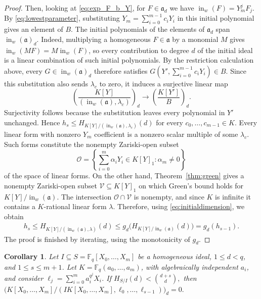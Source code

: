 \documentclass[11pt]{amsart}
\newtheorem{corollary}[theorem]{Corollary}
\theoremstyle{definition}
\newcommand{\F}{\mathbb F}
\newcommand{\ini}{\operatorname{in}}
\numberwithin{equation}{section}
\begin{document}
\begin{proof}
Then, looking at \eqref{eq:exp_F_b_Y}, for $F\in \mathfrak{a}_d$ we have
\(
\ini_w(F)=Y_m^jF_j.
\)
By \eqref{eq:lowestparameter}, substituting
$Y_m=\sum_{i=0}^{m-1}c_iY_i$ in this initial polynomial
gives an element of $B$.
The initial polynomials of the elements of $\mathfrak a_d$ span
$\ini_w(\mathfrak a)_d$. Indeed, multiplying a homogeneous
$F\in\mathfrak a$ by a monomial $M$ gives
$\ini_w(MF)=M\ini_w(F)$, so every contribution to degree $d$
of the initial ideal is a linear combination of such initial
polynomials. By the restriction calculation above, every
$G\in\ini_w(\mathfrak a)_d$ therefore satisfies
\(
G\left(Y',\sum_{i=0}^{m-1}c_iY_i\right)\in B.
\)
Since this substitution also sends $\lambda_c$ to zero,
it induces a surjective linear map
\[
\left(\frac{K[Y]}{(\ini_w(\mathfrak a),\lambda_c)}\right)_d
\rightarrow
\left(\frac{K[Y']}{B}\right)_d.
\]
Surjectivity follows because the substitution leaves every
polynomial in $Y'$ unchanged. Hence
\(
h_s\le H_{K[Y]/(\ini_w(\mathfrak a),\lambda_c)}(d)
\)
for every $c_0,\ldots,c_{m-1}\in K$.
Every linear form with nonzero $Y_m$ coefficient is a nonzero
scalar multiple of some $\lambda_c$. Such forms constitute
the nonempty Zariski-open subset
\[
\mathcal O=
\left\{
\sum_{i=0}^m\alpha_iY_i\in K[Y]_1:\alpha_m\ne0
\right\}
\]
of the space of linear forms. On the other hand,
Theorem~\ref{thm:green} gives a nonempty Zariski-open subset
$\mathcal V\subseteq K[Y]_1$ on which Green's bound holds
for $K[Y]/\ini_w(\mathfrak a)$. The intersection $\mathcal O\cap\mathcal V$
is nonempty, and since $K$ is infinite it contains a
$K$-rational linear form $\lambda$. Therefore, using
\eqref{eq:initialdimension},
we obtain
\[
\begin{aligned}
h_s
\le H_{K[Y]/(\ini_w(\mathfrak a),\lambda)}(d)
\le g_d\bigl(H_{K[Y]/\ini_w(\mathfrak a)}(d)\bigr)
=g_d(h_{s-1}).
\end{aligned}
\]
The proof is finished by iterating, using the monotonicity of $g_d$.
\end{proof}

\begin{corollary}\label{cor:flagvanishing}
Let $I\subseteq S=\F_q[X_0,\ldots,X_m]$ be a homogeneous ideal,
$1\le d<q$, and $1\le s\le m+1$. Let
$K=\F_q(a_0,\ldots,a_m)$, with algebraically independent $a_i$,
and consider $\ell_j=\sum_{i=0}^m a_i^{q^j}X_i$. If
\(
 H_{S/I}(d)<\binom{d+s}{d},
\)
then
\(
 \big(K[X_0,\ldots,X_m]/
       (IK[X_0,\ldots,X_m],\ell_0,\ldots,\ell_{s-1})\big)_d=0.
\)
\end{corollary}
\end{document}
